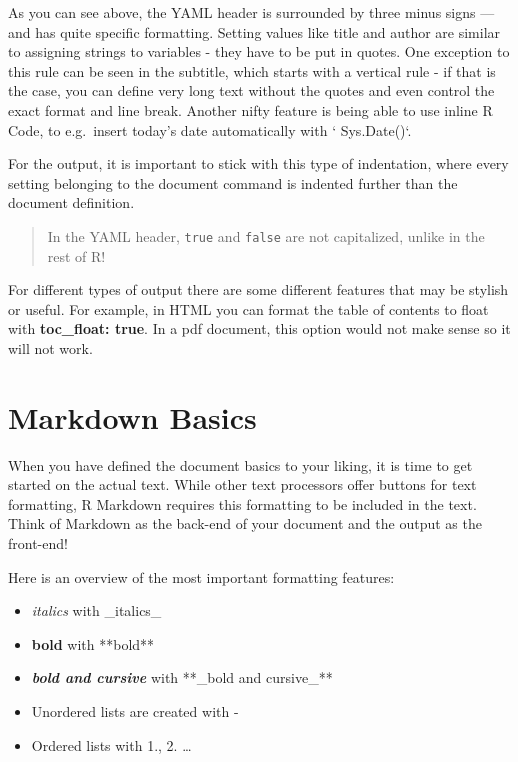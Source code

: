 \documentclass[
]{book}
\providecommand{\tightlist}{%
  \setlength{\itemsep}{0pt}\setlength{\parskip}{0pt}}
\begin{document}
As you can see above, the YAML header is surrounded by three minus signs --- and has quite specific formatting.
Setting values like title and author are similar to assigning strings to variables - they have to be put in quotes.
One exception to this rule can be seen in the subtitle, which starts with a vertical rule \textbar{} - if that is the case, you can define very long text without the quotes and even control the exact format and line break.
Another nifty feature is being able to use inline R Code, to e.g.~insert today's date automatically with ` Sys.Date()`.

For the output, it is important to stick with this type of indentation, where every setting belonging to the document command is indented further than the document definition.

\begin{quote}
In the YAML header, \texttt{true} and \texttt{false} are not capitalized, unlike in the rest of R!
\end{quote}

For different types of output there are some different features that may be stylish or useful.
For example, in HTML you can format the table of contents to float with \textbf{toc\_float: true}.
In a pdf document, this option would not make sense so it will not work.

\section{Markdown Basics}\label{markdown-basics}

When you have defined the document basics to your liking, it is time to get started on the actual text.
While other text processors offer buttons for text formatting, R Markdown requires this formatting to be included in the text.
Think of Markdown as the back-end of your document and the output as the front-end!

Here is an overview of the most important formatting features:

\begin{itemize}
\tightlist
\item
  \emph{italics} with \_italics\_
\item
  \textbf{bold} with **bold**
\item
  \textbf{\emph{bold and cursive}} with **\_bold and cursive\_**
\item
  Unordered lists are created with -
\item
  Ordered lists with 1., 2. \ldots{}
\end{itemize}
\end{document}
